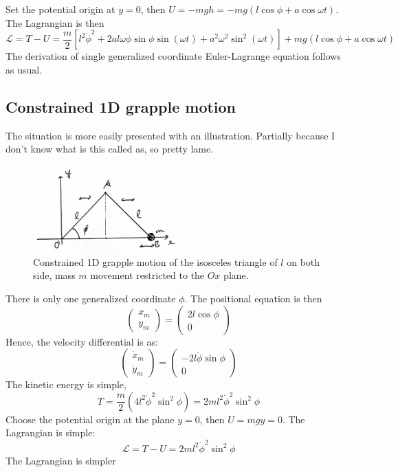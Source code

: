 Set the potential origin at $y=0$, then $U=-mgh = -mg(l\cos{\phi} + a\cos{\omega t})$. The Lagrangian is then
\begin{equation}
    \mathcal{L} = T - U = \frac{m}{2} \left[ l^{2}\dot{\phi}^{2} + 2 a l \omega \dot{\phi} \sin\phi \sin\left(\omega t\right) + a^{2} \omega^{2} \sin^{2}\left(\omega t\right) \right] + mg(l\cos{\phi} + a\cos{\omega t})
\end{equation}
The derivation of single generalized coordinate Euler-Lagrange equation follows as usual. 
\subsection{Constrained 1D grapple motion}
The situation is more easily presented with an illustration. Partially because I don't know what is this called as, so pretty lame. 
\begin{figure}[htb]
    \centering
    \includegraphics[width=0.5\textwidth]{img/peakengineering.jpg}
    \caption{Constrained 1D grapple motion of the isosceles triangle of $l$ on both side, mass $m$ movement restricted to the $Ox$ plane.}
\end{figure}
There is only one generalized coordinate $\phi$. The positional equation is then
\begin{equation}
    \begin{pmatrix}
        x_{m}\\
        y_{m}
    \end{pmatrix}
    = 
    \begin{pmatrix}
        2l \cos{\phi}\\
        0
    \end{pmatrix}
\end{equation}
Hence, the velocity differential is as:
\begin{equation}
    \begin{pmatrix}
        \dot{x}_{m}\\
        \dot{y}_{m}
    \end{pmatrix}
    = 
    \begin{pmatrix}
        -2l \dot{\phi}\sin{\phi}\\
        0
    \end{pmatrix}
\end{equation}
The kinetic energy is simple,
\begin{equation}
    T= \frac{m}{2} \left( 4l^{2}\dot{\phi}^{2}\sin^{2}{\phi} \right)  = 2ml^{2}\dot{\phi}^{2}\sin^{2}{\phi}
\end{equation}
Choose the potential origin at the plane $y=0$, then $U=mgy=0$. The Lagrangian is simple: 
\begin{equation}
    \mathcal{L} = T- U = 2ml^{2}\dot{\phi}^{2}\sin^{2}{\phi}
\end{equation}
The Lagrangian is simpler


